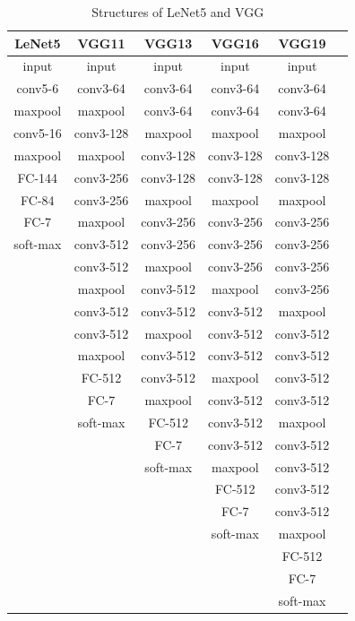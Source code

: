\documentclass[journal, onecolumn]{IEEEtran}
\begin{document}
\begin{table}
\caption{Structures of LeNet5 and VGG}
\label{tab:LeNet5-VGG}
\begin{center}
\begin{tabular}{|c|c|c|c|c| p{5cm}|}
\hline
LeNet5 & VGG11      & VGG13         & VGG16     & VGG19  \\ \hline 
input & input & input               & input & input  \\  
conv5-6 & conv3-64   & conv3-64     & conv3-64  & conv3-64  \\
maxpool & maxpool & conv3-64        & conv3-64 & conv3-64  \\  
conv5-16 & conv3-128 & maxpool      & maxpool  & maxpool  \\  
maxpool & maxpool & conv3-128       & conv3-128 & conv3-128  \\  
FC-144 & conv3-256 & conv3-128      & conv3-128 & conv3-128  \\  
FC-84 & conv3-256 & maxpool         & maxpool & maxpool  \\  
FC-7 & maxpool & conv3-256          & conv3-256 & conv3-256  \\  
soft-max & conv3-512 & conv3-256    & conv3-256 & conv3-256  \\
 & conv3-512 & maxpool              & conv3-256 & conv3-256  \\  
 & maxpool & conv3-512              & maxpool & conv3-256  \\  
 & conv3-512 & conv3-512            & conv3-512 & maxpool  \\
 & conv3-512 & maxpool              & conv3-512 & conv3-512  \\  
 & maxpool & conv3-512              & conv3-512 & conv3-512  \\
 & FC-512  & conv3-512              & maxpool & conv3-512  \\  
 &FC-7 & maxpool                 & conv3-512 & conv3-512  \\  
 & soft-max &    FC-512                & conv3-512 & maxpool  \\  
 &  &  FC-7                & conv3-512 & conv3-512  \\   
  &  &  soft-max                        & maxpool & conv3-512  \\
   &  &                    & FC-512 & conv3-512  \\
    &  &                            & FC-7 & conv3-512  \\  
  &  &                          &      soft-max     & maxpool  \\
   &  &                     &               & FC-512   \\
    &  &                            &       & FC-7  \\  
        &  &                        &       & soft-max \\  \hline 
\end{tabular}
\end{center}
\end{table}  
\end{document}
